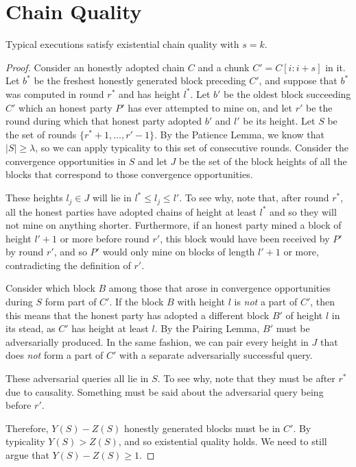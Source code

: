 \section{Chain Quality}

\begin{theorem}
  Typical executions satisfy existential chain quality
  with $s = k$.
\end{theorem}
\begin{proof}
  Consider an honestly adopted chain $C$ and a chunk $C' = C[i{:}i + s]$ in it.
  Let $b^*$ be the freshest honestly generated block preceding $C'$,
  and suppose that $b^*$ was computed in round $r^*$ and has height $l^*$.
  Let $b'$ be the oldest block succeeding $C'$
  which an honest party $P'$ has ever attempted to mine on,
  and let $r'$ be the round during which that honest party
  adopted $b'$ and $l'$ be its height.
  Let $S$ be the set of rounds $\{r^* + 1, \ldots, r' - 1\}$.
  By the Patience Lemma, we know that $|S| \geq \lambda$,
  so we can apply typicality to this set of consecutive rounds.
  Consider the convergence opportunities in $S$
  and let $J$ be the set of the block heights of all
  the blocks that correspond to those convergence opportunities.

  These heights $l_j \in J$ will lie in $l^* \leq l_j \leq l'$.
  To see why, note that, after round $r^*$, all the honest parties
  have adopted chains of height at least $l^*$ and so they will
  not mine on anything shorter. Furthermore, if an honest party
  mined a block of height $l' + 1$ or more before round $r'$,
  this block would have been received by $P'$ by round $r'$,
  and so $P'$ would only mine on blocks of length $l' + 1$ or
  more, contradicting the definition of $r'$.

  Consider which block $B$ among those that arose in convergence
  opportunities during $S$ form part of $C'$. If the block $B$
  with height $l$
  is \emph{not} a part of $C'$, then this means that the
  honest party has adopted a different block $B'$ of height $l$ in
  its stead, as $C'$ has height at least $l$. By the Pairing Lemma,
  $B'$ must be adversarially produced. In the same fashion, we can
  pair every height in $J$ that does \emph{not} form a part of $C'$
  with a separate adversarially successful query.

  These adversarial queries all lie in $S$. To see why, note that
  they must be after $r^*$ due to causality.
  {\color{red} Something must be said about the adversarial query
  being before $r'$.}

  Therefore, $Y(S) - Z(S)$ honestly generated blocks must be in
  $C'$. By typicality $Y(S) > Z(S)$, and so existential quality
  holds.
  {\color{red} We need to still argue that $Y(S) - Z(S) \geq 1$.}
\end{proof}

